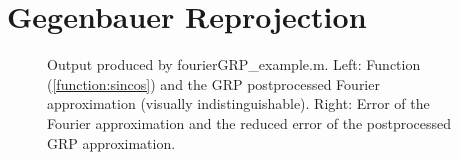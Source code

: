 \documentclass[12pt]{article}
\begin{document}
\section{Gegenbauer Reprojection}

\begin{figure}[tbh]
   \centering
 \caption{Output produced by fourierGRP\_example.m. Left: Function (\ref{function:sincos}) and the GRP postprocessed Fourier approximation (visually indistinguishable).  Right: Error of the Fourier approximation and the
 reduced error of the postprocessed GRP approximation.
          } \label{fig:fourierGrpExample}
 \end{figure}
 
\end{document}
